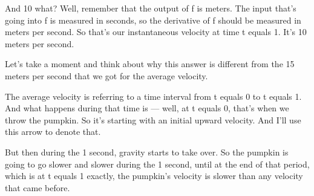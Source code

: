 \documentclass[pdftex, brazil, 12pt, twoside]{article}
\begin{document}
And 10 what?
Well, remember that the output of f is meters.
The input that's going into f is measured in seconds,
so the derivative of f should be measured in meters per second.
So that's our instantaneous velocity at time t equals 1.
It's 10 meters per second.

\begin{figure}[H]
  \begin{center}
    \label{fig:derivative-at-point-2}
  \end{center}
\end{figure}

Let's take a moment and think about why this answer is
different from the 15 meters per second
that we got for the average velocity.

The average velocity is referring to a time interval
from t equals 0 to t equals 1.
And what happens during that time is --- well,
at t equals 0, that's when we throw the pumpkin.
So it's starting with an initial upward velocity.
And I'll use this arrow to denote that.

But then during the 1 second, gravity starts to take over.
So the pumpkin is going to go slower and slower during the 1
second, until at the end of that period, which
is at t equals 1 exactly, the pumpkin's velocity is
slower than any velocity that came before.

\begin{figure}[H]
  \begin{center}
  \end{center}
\end{figure}
\end{document}
